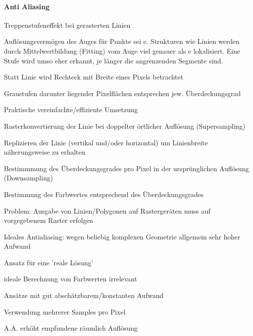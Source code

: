\documentclass[landscape]{article}
\begin{document}
\begin{multicols}{3}
  \paragraph{Anti Aliasing}
  \begin{itemize*}
    \item Treppenstufeneffekt bei gerasterten Linien
    \item Auflösungsvermögen des Auges für Punkte sei e. Strukturen wie Linien werden durch Mittelwertbildung (Fitting) vom Auge viel genauer als e lokalisiert. Eine Stufe wird umso eher erkannt, je länger die angrenzenden Segmente sind.
    \begin{itemize*}
      \item Statt Linie wird Rechteck mit Breite eines Pixels betrachtet
      \item Graustufen darunter liegender Pixelflächen entsprechen jew. Überdeckungsgrad
    \end{itemize*}
    \item Praktische vereinfachte/effiziente Umsetzung
    \begin{itemize*}
      \item Rasterkonvertierung der Linie bei doppelter örtlicher Auflösung (Supersampling)
      \item Replizieren der Linie (vertikal und/oder horizontal) um Linienbreite näherungsweise zu erhalten
      \item Bestimmmung des Überdeckungsgrades pro Pixel in der ursprünglichen Auflösung (Downsampling)
      \item Bestimmung des Farbwertes entsprechend des Überdeckungsgrades
      \item Problem: Ausgabe von Linien/Polygonen auf Rastergeräten muss auf vorgegebenem Raster erfolgen
    \end{itemize*}
    \item Ideales Antialiasing: wegen beliebig komplexen Geometrie allgemein sehr hoher Aufwand
    \item Ansatz für eine 'reale Lösung'
    \begin{itemize*}
      \item ideale Berechnung von Farbwerten irrelevant
      \item Ansätze mit gut abschätzbarem/konstanten Aufwand
      \item Verwendung mehrerer Samples pro Pixel
    \end{itemize*}
    \item A.A. erhöht empfundene räumlich Auflösung
  \end{itemize*}
  

\end{multicols}
\end{document}
